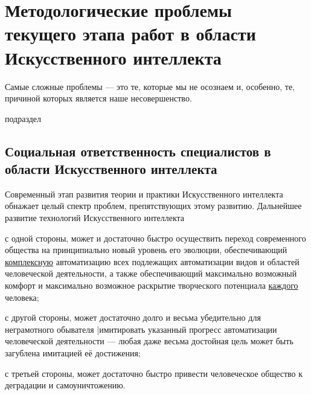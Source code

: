 \section*{Методологические проблемы текущего этапа работ в области Искусственного интеллекта}

\begin{SCn}
	{Самые сложные проблемы --- это те, которые мы не осознаем и, особенно, те, причиной которых является наше несовершенство.
	}
	
	\begin{scnrelfromlist}{подраздел}
	\end{scnrelfromlist}
\end{SCn}

\subsection*{Социальная ответственность специалистов в области Искусственного интеллекта}
Современный этап развития теории и практики Искусственного интеллекта обнажает целый спектр проблем, препятствующих этому развитию. Дальнейшее развитие технологий Искусственного интеллекта
\begin{textitemize}
	\item с одной стороны, может и достаточно быстро осуществить переход современного общества на принципиально новый уровень его эволюции, обеспечивающий \uline{комплексную} автоматизацию всех подлежащих автоматизации видов и областей человеческой деятельности, а также обеспечивающий максимально возможный комфорт и максимально возможное раскрытие творческого потенциала \uline{каждого} человека;
	\item с другой стороны, может достаточно долго и весьма убедительно для неграмотного обывателя \uline|{имитировать} указанный прогресс автоматизации человеческой деятельности --- любая даже весьма достойная цель может быть загублена имитацией её достижения;
	\item с третьей стороны, может достаточно быстро привести человеческое общество к деградации и самоуничтожению.
\end{textitemize}

